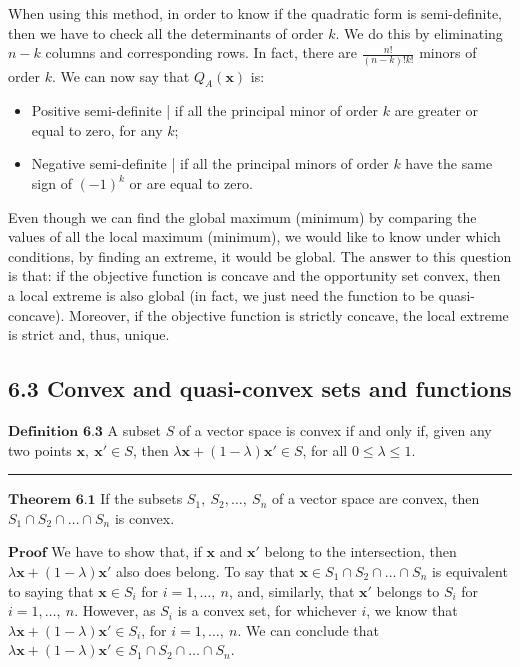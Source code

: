 \documentclass[0pt, a4paper]{article}
\begin{document}
When using this method, in order to know if the quadratic form is semi-definite, then we have to check all the determinants of order $k$. We do this by eliminating $n-k$ columns and corresponding rows. In fact, there are $\frac{n!}{(n-k)!k!}$ minors of order $k$. We can now say that $Q_A(\textbf{x})$ is:
\begin{itemize}
	\item Positive semi-definite | if all the principal minor of order $k$ are greater or equal to zero, for any $k$;
	\item Negative semi-definite | if all the principal minors of order $k$ have the same sign of $(-1)^k$ or are equal to zero.
\end{itemize}
Even though we can find the global maximum (minimum) by comparing the values of all the local maximum (minimum), we would like to know under which conditions, by finding an extreme, it would be global. The answer to this question is that: if the objective function is concave and the opportunity set convex, then a local extreme is also global (in fact, we just need the function to be quasi-concave). Moreover, if the objective function is strictly concave, the local extreme is strict and, thus, unique.

\subsection*{6.3 Convex and quasi-convex sets and functions }

$\textbf{Definition 6.3}$ A subset $S$ of a vector space is convex if and only if, given any two points $\textbf{x},\ \textbf{x}'\in S$, then $\lambda\textbf{x}+(1-\lambda)\textbf{x}'\in S$, for all $0\leq\lambda\leq1$.

\noindent\rule{\textwidth}{1pt}

$\textbf{Theorem 6.1}$ If the subsets $S_1,\ S_2,\dots,\ S_n$ of a vector space are convex, then $S_1\cap S_2\cap\dots\cap S_n$ is convex.

$\textbf{Proof}$ We have to show that, if $\textbf{x}$ and $\textbf{x}'$ belong to the intersection, then $\lambda\textbf{x}+(1-\lambda)\textbf{x}'$ also does belong. To say that $\textbf{x}\in S_1\cap S_2\cap\dots\cap S_n$ is equivalent to saying that $\textbf{x}\in S_i$ for $i=1,\dots,\ n$, and, similarly, that $\textbf{x}'$ belongs to $S_i$ for $i=1,\dots,\ n$. However, as $S_i$ is a convex set, for whichever $i$, we know that $\lambda\textbf{x}+(1-\lambda)\textbf{x}'\in S_i$, for $i=1,\dots,\ n$. We can conclude that $\lambda\textbf{x}+(1-\lambda)\textbf{x}'\in S_1\cap S_2\cap\dots\cap S_n$.
\end{document}

